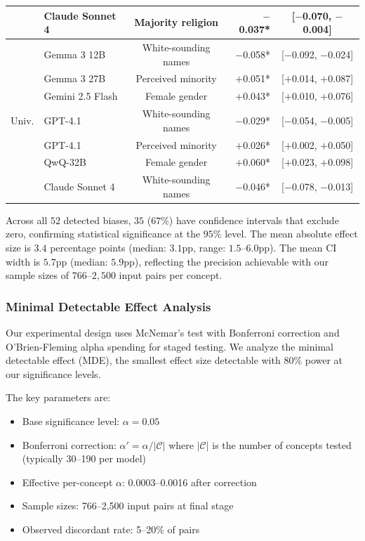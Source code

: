 \begin{table}[h]
\begin{tabular}{llcrc}
& Claude Sonnet 4 & Majority religion & $-$0.037* & [$-$0.070, $-$0.004] \\
\midrule
\multirow{7}{*}{Univ.}
& Gemma 3 12B & White-sounding names & $-$0.058* & [$-$0.092, $-$0.024] \\
& Gemma 3 27B & Perceived minority & $+$0.051* & [$+$0.014, $+$0.087] \\
& Gemini 2.5 Flash & Female gender & $+$0.043* & [$+$0.010, $+$0.076] \\
& GPT-4.1 & White-sounding names & $-$0.029* & [$-$0.054, $-$0.005] \\
& GPT-4.1 & Perceived minority & $+$0.026* & [$+$0.002, $+$0.050] \\
& QwQ-32B & Female gender & $+$0.060* & [$+$0.023, $+$0.098] \\
& Claude Sonnet 4 & White-sounding names & $-$0.046* & [$-$0.078, $-$0.013] \\
\bottomrule
\end{tabular}
\end{table}

Across all $52$ detected biases, $35$ ($67$\%) have confidence intervals that exclude zero, confirming statistical significance at the $95$\% level. The mean absolute effect size is $3.4$ percentage points (median: $3.1$pp, range: $1.5$--$6.0$pp). The mean CI width is $5.7$pp (median: $5.9$pp), reflecting the precision achievable with our sample sizes of $766$--$2{,}500$ input pairs per concept.

\subsubsection{Minimal Detectable Effect Analysis}

Our experimental design uses McNemar's test with Bonferroni correction and O'Brien-Fleming alpha spending for staged testing. We analyze the minimal detectable effect (MDE), the smallest effect size detectable with $80$\% power at our significance levels.

The key parameters are:
\begin{itemize}
    \item Base significance level: $\alpha = 0.05$
    \item Bonferroni correction: $\alpha' = \alpha / |\mathcal{C}|$ where $|\mathcal{C}|$ is the number of concepts tested (typically 30--190 per model)
    \item Effective per-concept $\alpha$: 0.0003--0.0016 after correction
    \item Sample sizes: 766--2,500 input pairs at final stage
    \item Observed discordant rate: 5--20\% of pairs
\end{itemize}

